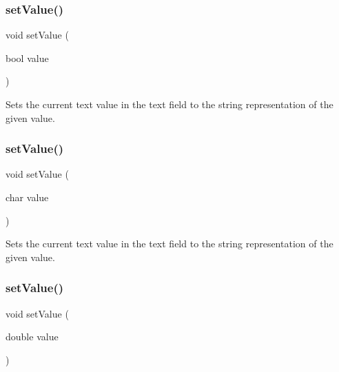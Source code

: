 \subsubsection{\texorpdfstring{set\+Value()}{setValue()}\hspace{0.1cm}{\footnotesize\ttfamily [1/5]}}
{\footnotesize\ttfamily void set\+Value (\begin{DoxyParamCaption}\item[{bool}]{value }\end{DoxyParamCaption})\hspace{0.3cm}{\ttfamily [virtual]}}



Sets the current text value in the text field to the string representation of the given value. 

\mbox{\label{classGTextField_aeefe59b3d414b657838869ce084cb0e2}} 
\subsubsection{\texorpdfstring{set\+Value()}{setValue()}\hspace{0.1cm}{\footnotesize\ttfamily [2/5]}}
{\footnotesize\ttfamily void set\+Value (\begin{DoxyParamCaption}\item[{char}]{value }\end{DoxyParamCaption})\hspace{0.3cm}{\ttfamily [virtual]}}



Sets the current text value in the text field to the string representation of the given value. 

\mbox{\label{classGTextField_a1a31743bc7def7cf7fdad044c84d9268}} 
\subsubsection{\texorpdfstring{set\+Value()}{setValue()}\hspace{0.1cm}{\footnotesize\ttfamily [3/5]}}
{\footnotesize\ttfamily void set\+Value (\begin{DoxyParamCaption}\item[{double}]{value }\end{DoxyParamCaption})\hspace{0.3cm}{\ttfamily [virtual]}}



